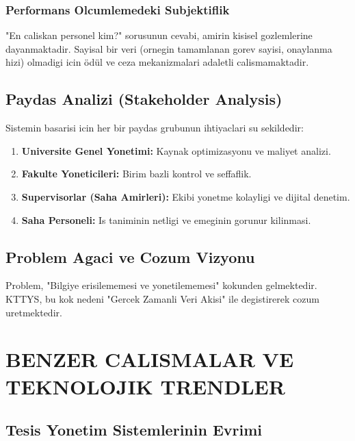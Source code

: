 \documentclass[12pt,a4paper,oneside]{report}
\begin{document}
\subsection{Performans Olcumlemedeki Subjektiflik}
"En caliskan personel kim?" sorusunun cevabi, amirin kisisel gozlemlerine dayanmaktadir. Sayisal bir veri (ornegin tamamlanan gorev sayisi, onaylanma hizi) olmadigi icin ödül ve ceza mekanizmalari adaletli calismamaktadir.

\section{Paydas Analizi (Stakeholder Analysis)}

Sistemin basarisi icin her bir paydas grubunun ihtiyaclari su sekildedir:
\begin{enumerate}
    \item \textbf{Universite Genel Yonetimi:} Kaynak optimizasyonu ve maliyet analizi.
    \item \textbf{Fakulte Yoneticileri:} Birim bazli kontrol ve seffaflik.
    \item \textbf{Supervisorlar (Saha Amirleri):} Ekibi yonetme kolayligi ve dijital denetim.
    \item \textbf{Saha Personeli:} Is taniminin netligi ve emeginin gorunur kilinmasi.
\end{enumerate}

\section{Problem Agaci ve Cozum Vizyonu}

Problem, "Bilgiye erisilememesi ve yonetilememesi" kokunden gelmektedir. KTTYS, bu kok nedeni "Gercek Zamanli Veri Akisi" ile degistirerek cozum uretmektedir.

\chapter{BENZER CALISMALAR VE TEKNOLOJIK TRENDLER}
\label{chap:literatur}

\section{Tesis Yonetim Sistemlerinin Evrimi}
\end{document}
